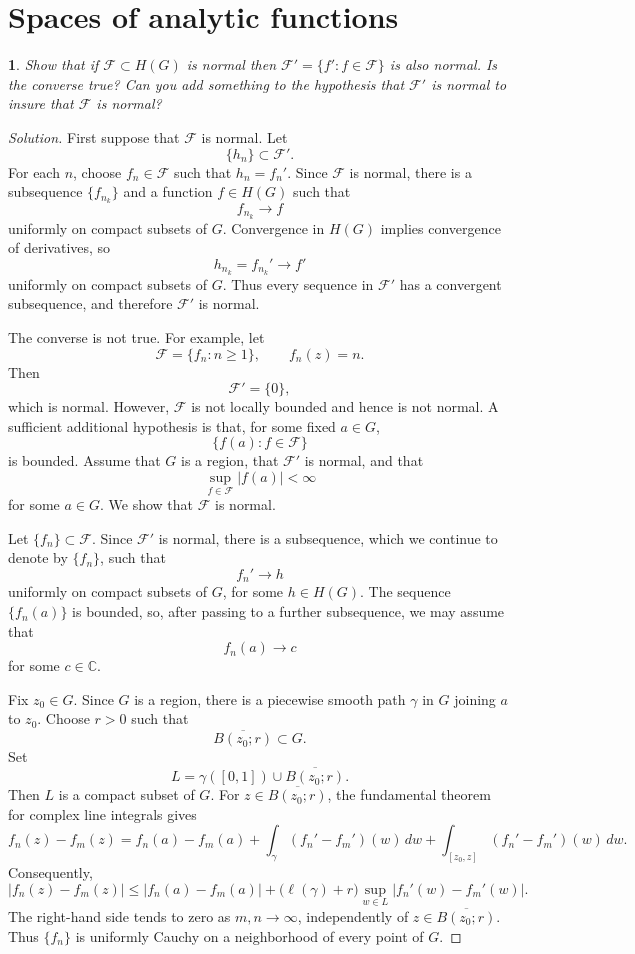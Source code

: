 \documentclass[12pt, a4paper]{report}
\theoremstyle{spaced}
\newtheorem{exercise}{}
\newcommand{\setexercise}[1]{\setcounter{exercise}{#1-1}}
\begin{document}
\section{Spaces of analytic functions}
\setexercise{6}
\begin{exercise}
	Show that if $\mathcal{F}\subset H(G)$ is normal then
	$\mathcal{F}'=\{f' : f\in\mathcal{F}\}$ is also normal.
	Is the converse true? Can you add something to the hypothesis that
	$\mathcal{F}'$ is normal to insure that $\mathcal{F}$ is normal?
\end{exercise}

\begin{proof}[Solution]
	First suppose that \(\mathcal{F}\) is normal. Let
	\[
		\{h_n\}\subset \mathcal{F}'.
	\]
	For each \(n\), choose \(f_n\in\mathcal{F}\) such that \(h_n=f_n'\).
	Since \(\mathcal{F}\) is normal, there is a subsequence
	\(\{f_{n_k}\}\) and a function \(f\in H(G)\) such that
	\[
		f_{n_k}\longrightarrow f
	\]
	uniformly on compact subsets of \(G\). Convergence in \(H(G)\) implies
	convergence of derivatives, so
	\[
		h_{n_k}=f_{n_k}'\longrightarrow f'
	\]
	uniformly on compact subsets of \(G\). Thus every sequence in
	\(\mathcal{F}'\) has a convergent subsequence, and therefore
	\(\mathcal{F}'\) is normal.

	The converse is not true. For example, let
	\[
		\mathcal{F}=\{f_n:n\geq 1\},
		\qquad
		f_n(z)=n.
	\]
	Then
	\[
		\mathcal{F}'=\{0\},
	\]
	which is normal. However, \(\mathcal{F}\) is not locally bounded and
	hence is not normal.
	A sufficient additional hypothesis is that, for some fixed
	\(a\in G\),
	\[
		\{f(a):f\in\mathcal{F}\}
	\]
	is bounded. Assume that \(G\) is a region, that \(\mathcal{F}'\) is
	normal, and that
	\[
		\sup_{f\in\mathcal{F}}|f(a)|<\infty
	\]
	for some \(a\in G\). We show that \(\mathcal{F}\) is normal.

	Let \(\{f_n\}\subset\mathcal{F}\). Since \(\mathcal{F}'\) is normal,
	there is a subsequence, which we continue to denote by \(\{f_n\}\),
	such that
	\[
		f_n'\longrightarrow h
	\]
	uniformly on compact subsets of \(G\), for some \(h\in H(G)\).
	The sequence \(\{f_n(a)\}\) is bounded, so, after passing to a further
	subsequence, we may assume that
	\[
		f_n(a)\longrightarrow c
	\]
	for some \(c\in\mathbb{C}\).

	Fix \(z_0\in G\). Since \(G\) is a region, there is a piecewise smooth
	path \(\gamma\) in \(G\) joining \(a\) to \(z_0\). Choose \(r>0\) such
	that
	\[
		\overline{B(z_0;r)}\subset G.
	\]
	Set
	\[
		L=\gamma([0,1])\cup\overline{B(z_0;r)}.
	\]
	Then \(L\) is a compact subset of \(G\). For \(z\in\overline{B(z_0;r)}\),
	the fundamental theorem for complex line integrals gives
	\[
		f_n(z)-f_m(z)
		=
		f_n(a)-f_m(a)
		+\int_{\gamma}(f_n'-f_m')(w)\,dw
		+\int_{[z_0,z]}(f_n'-f_m')(w)\,dw.
	\]
	Consequently,
	\[
		|f_n(z)-f_m(z)|
		\leq
		|f_n(a)-f_m(a)|
		+\bigl(\ell(\gamma)+r\bigr)
		\sup_{w\in L}|f_n'(w)-f_m'(w)|.
	\]
	The right-hand side tends to zero as \(m,n\to\infty\), independently
	of \(z\in\overline{B(z_0;r)}\). Thus \(\{f_n\}\) is uniformly Cauchy
	on a neighborhood of every point of \(G\).


\end{proof}
\end{document}
